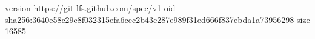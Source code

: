 version https://git-lfs.github.com/spec/v1
oid sha256:3640e58c29e8f032315efa6cec2b43c287e989f31ed666f837ebda1a73956298
size 16585

